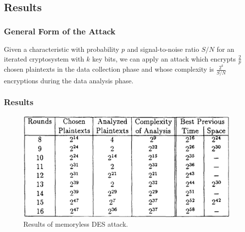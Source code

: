 \documentclass{beamer}
\begin{document}
    \subsection{Results}
    \label{subsec:results}

    \begin{frame}
        \frametitle{General Form of the Attack}
        \begin{theorem}
        \label{thm:gen-attack}    
        Given a characteristic with probability \(p\) and signal-to-noise ratio
        \(S/N\) for an iterated cryptosystem with \(k\) key bits, we can apply
        an attack which encrypts \(\frac{2}{p}\) chosen plaintexts in the data
        collection phase and whose complexity is \(\frac{2^k}{S/N}\) encryptions
        during the data analysis phase.
        \end{theorem}
        
    \end{frame}
    

    \begin{frame}
        \frametitle{Results}
        \begin{figure}[!ht]
            \centering
            \includegraphics[width=0.7\linewidth]{images/summary_new.png}
            \caption{Results of memoryless DES attack.}
            \label{fig:des-new-summary}
        \end{figure}
    \end{frame}
\end{document}
